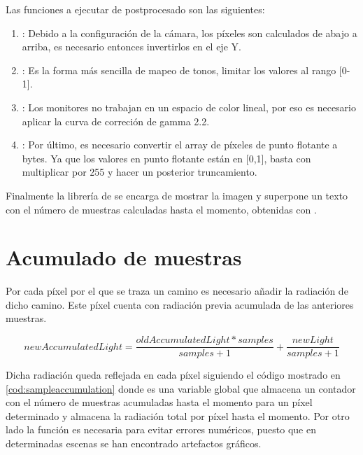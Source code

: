 Las funciones a ejecutar de postprocesado son las siguientes:

\begin{enumerate}
	
	\item {}: Debido a la configuración de la cámara, los píxeles son calculados de abajo a arriba, es necesario entonces invertirlos en el eje Y.
	\item {}: Es la forma más sencilla de mapeo de tonos, limitar los valores al rango [0-1].
	\item {}: Los monitores no trabajan en un espacio de color lineal, por eso es necesario aplicar la curva de correción de gamma 2.2.
	\item {}: Por último, es necesario convertir el array de píxeles de punto flotante a bytes. Ya que los valores en punto flotante están en [0,1], basta con multiplicar por 255 y hacer un posterior truncamiento.

\end{enumerate}

Finalmente la librería de  se encarga de mostrar la imagen y superpone un texto con el número de muestras calculadas hasta el momento, obtenidas con .

\section{Acumulado de muestras}
	
Por cada píxel por el que se traza un camino es necesario añadir la radiación de dicho camino. Este píxel cuenta con radiación previa acumulada de las anteriores muestras.

\[{newAccumulatedLight = \frac{oldAccumulatedLight * samples}{samples + 1} + \frac{newLight}{samples + 1}}\]
	
Dicha radiación queda reflejada en cada píxel siguiendo el código mostrado en \autoref{cod:sampleaccumulation} donde  es una variable global que almacena un contador con el número de muestras acumuladas hasta el momento para un píxel determinado y  almacena la radiación total por píxel hasta el momento. Por otro lado
la función  es necesaria para evitar errores numéricos, puesto que en determinadas escenas se han encontrado artefactos gráficos.

